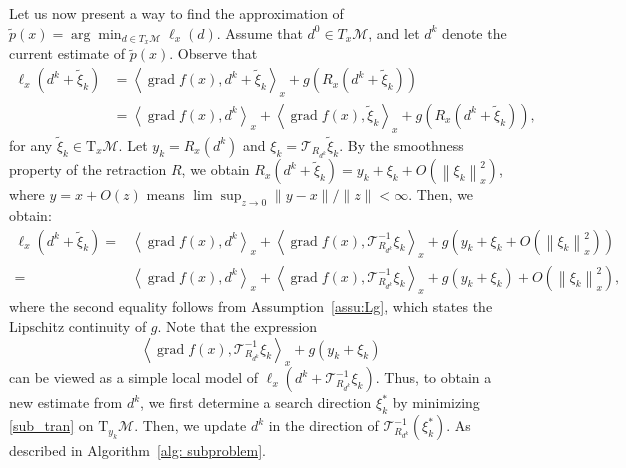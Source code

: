 \documentclass[pdflatex,sn-mathphys-num]{sn-jnl}%
\theoremstyle{definition} %
\theoremstyle{remark} %
\begin{document}
Let us now present a way to find the approximation of $\tilde{p}(x) = \arg\min_{d \in T_{x}\mathcal{M}} \ell_x(d)$. Assume that $d^0  \in T_{x}\mathcal{M}$, and let \( d^k \) denote the current estimate of \( \tilde{p}(x) \). Observe that
\begin{align*}
    \ell_x(d^k+\tilde{\xi}_k)
    &= \left\langle\operatorname{grad} f\left(x\right), d^k +\tilde{\xi}_k\right\rangle_{x} + g(R_{x}(d^k+\tilde{\xi}_k)) \\
    &=\left\langle\operatorname{grad} f\left(x\right), d^k \right\rangle_{x}+\left\langle\operatorname{grad} f\left(x\right), \tilde{\xi}_k\right\rangle_{x} + g(R_{x}(d^k+\tilde{\xi}_k)),
\end{align*}
for any $\tilde{\xi}_k \in \mathrm{T}_x \mathcal{M}$.
Let $y_k=R_x\left(d^k\right)$ and $\xi_k=\mathcal{T}_{R_{d^k}} \tilde{\xi}_k$. By the smoothness property of the retraction $R$, 
we obtain $R_x (d^k+\tilde{\xi}_k)=y_k+\xi_k+O\left(\left\|\xi_k\right\|_x^2\right)$, where $y=x+O(z)$ means $\lim \sup _{z \rightarrow 0}\|y-x\| /\|z\|<\infty$. Then, we obtain:
$$
\begin{aligned}
\ell_x(d^k+\tilde{\xi}_k)
= & \left\langle\operatorname{grad} f(x), d^k\right\rangle_x +\left\langle\operatorname{grad} f(x), \mathcal{T}_{R_{d^k}}^{-1} \xi_k\right\rangle_x+g\left(y_k+\xi_k+O\left(\left\|\xi_k\right\|_x^2\right)\right)  \\
= & \left\langle\operatorname{grad} f(x), d^k\right\rangle_x  +\left\langle\operatorname{grad} f(x), \mathcal{T}_{R_{d^k}}^{-1} \xi_k\right\rangle_x+g\left(y_k+\xi_k\right)+O\left(\left\|\xi_k\right\|_x^2\right),  
\end{aligned}
$$
where the second equality follows from Assumption~\ref{assu:Lg}, which states the Lipschitz continuity of \(g\). Note that the expression
\begin{equation}\label{sub_tran}
\left\langle\operatorname{grad} f(x), \mathcal{T}_{R_{d^k}}^{-1} \xi_k\right\rangle_{x}+g\left(y_k+\xi_k\right)
\end{equation}
can be viewed as a simple local model of \( \ell_x\left(d^k + \mathcal{T}_{R_{d^k}}^{-1} \xi_k\right) \). 
Thus, to obtain a new estimate from \( d^k \), we first determine a search direction \( \xi_k^* \) by minimizing \eqref{sub_tran} on \( \mathrm{T}_{y_k} \mathcal{M} \). Then, we update \( d^k \) in the direction of \( \mathcal{T}_{R_{d^k}}^{-1}(\xi_k^*) \).
As described in Algorithm~\ref{alg: subproblem}.
\end{document}
